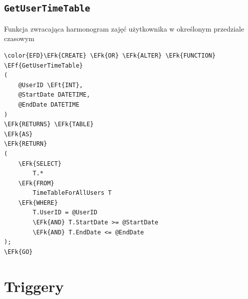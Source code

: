 \documentclass[11pt]{article}
\newcommand{\EFk}[1]{\textcolor{EFk}{\textbf{#1}}} %
\newcommand{\EFf}[1]{\textcolor{EFf}{#1}} %
\newcommand{\EFt}[1]{\textcolor{EFt}{\textbf{#1}}} %
\begin{document}
\subsection{\texttt{GetUserTimeTable}}
\label{sec:orgadaa142}
Funkcja zwracająca harmonogram zajęć użytkownika w określonym przedziale czasowym
\begin{Code}
\begin{Verbatim}
\color{EFD}\EFk{CREATE} \EFk{OR} \EFk{ALTER} \EFk{FUNCTION} \EFf{GetUserTimeTable} 
(
    @UserID \EFt{INT},
    @StartDate DATETIME,
    @EndDate DATETIME
)
\EFk{RETURNS} \EFk{TABLE}
\EFk{AS}
\EFk{RETURN}
(
    \EFk{SELECT} 
        T.*
    \EFk{FROM} 
        TimeTableForAllUsers T
    \EFk{WHERE} 
        T.UserID = @UserID
        \EFk{AND} T.StartDate >= @StartDate
        \EFk{AND} T.EndDate <= @EndDate
);
\EFk{GO}
\end{Verbatim}
\end{Code}
\section{Triggery}
\label{sec:org3a361b4}
\end{document}
